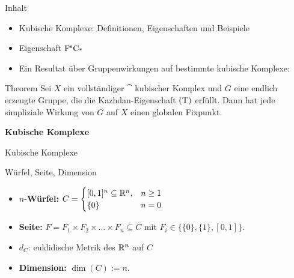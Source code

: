 \documentclass[10pt,aspectratio=169]{beamer}
\date{07. Mai 2015}
\begin{document}
\begin{frame}[t]
	\titlepage
\end{frame}

\begin{frame}{Inhalt}
	\begin{itemize}
		\item Kubische Komplexe: Definitionen, Eigenschaften und Beispiele \pause
		\item Eigenschaft $\operatorname{F^sC_*}$ \pause
		\item Ein Resultat über Gruppenwirkungen auf bestimmte kubische Komplexe: \pause
	\end{itemize}
	\begin{block}{Theorem}
		Sei $X$ ein vollständiger $\cat$ kubischer Komplex und $G$ eine endlich erzeugte Gruppe, die die Kazhdan-Eigenschaft $\operatorname{(T)}$ erfüllt. Dann hat jede simpliziale Wirkung von $G$ auf $X$ einen globalen Fixpunkt.
	\end{block}
\end{frame}

\begin{frame}[c]{}
\begin{center}
	{\Huge \selectfont \textbf{Kubische Komplexe}}
\end{center}
\end{frame}

\begin{frame}{Kubische Komplexe}
	\begin{block}{Würfel, Seite, Dimension}
		\begin{itemize}
			\item $n$-\textbf{Würfel:} $C = \begin{cases}
				[0,1]^n \subseteq \mathbb{R}^n, & n \geq 1 \\
				\{0\} & n=0
			\end{cases}$ \pause
			\item \textbf{Seite:} $F = F_1 \times F_2 \times \dots \times F_n \subseteq C$ 
				mit $F_i \in \{ \{0\}, \{1\}, [0,1]\}$. \pause
			\item $d_C$: euklidische Metrik des $\mathbb{R}^n$ auf $C$ \pause
			\item \textbf{Dimension:} $\dim(C) := n$.
		\end{itemize}
	\end{block}	
\end{frame}
\end{document}
